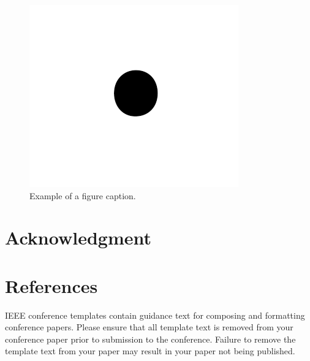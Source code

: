 \documentclass[conference]{IEEEtran}
\begin{document}
\begin{figure}[htbp]
    \centerline{\includegraphics{fig1.png}}
    \caption{Example of a figure caption.}
    \label{fig}
\end{figure}


\section*{Acknowledgment}

\section*{References}

\balance





\vspace{12pt}
\color{red}
IEEE conference templates contain guidance text for composing and formatting conference papers. Please ensure that all template text is removed from your conference paper prior to submission to the conference. Failure to remove the template text from your paper may result in your paper not being published.
\end{document}
